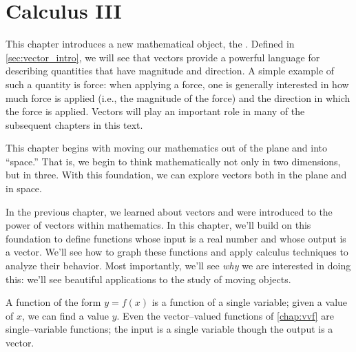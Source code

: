 \part{Calculus III}



This chapter introduces a new mathematical object, the . Defined in \autoref{sec:vector_intro}, we will see that vectors provide a powerful language for describing quantities that have magnitude and direction. A simple example of such a quantity is force: when applying a force, one is generally interested in how much force is applied (i.e., the magnitude of the force) and the direction in which the force is applied. Vectors will play an important role in many of the subsequent chapters in this text. 

This chapter begins with moving our mathematics out of the plane and into ``space.'' That is, we begin to think mathematically not only in two dimensions, but in three. With this foundation, we can explore vectors both in the plane and in space. 











In the previous chapter, we learned about vectors and were introduced to the power of vectors within mathematics. In this chapter, we'll build on this foundation to define functions whose input is a real number and whose output is a vector. We'll see how to graph these functions and apply calculus techniques to analyze their behavior. Most importantly, we'll see \textit{why} we are interested in doing this: we'll see beautiful applications to the study of moving objects.









A function of the form $y=f(x)$ is a function of a single variable; given a value of $x$, we can find a value $y$. Even the vector--valued functions of \autoref{chap:vvf} are single--variable functions; the input is a single variable though the output is a vector.


